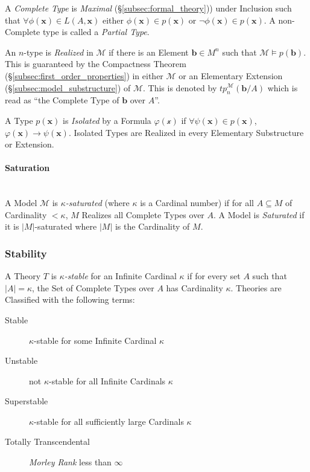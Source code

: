 \documentclass{article}
\begin{document}
A \emph{Complete Type} is \emph{Maximal}
(\S\ref{subsec:formal_theory})) under Inclusion such that $\forall
\phi(\mathbf{x}) \in L(A,\mathbf{x})$ either $\phi(\mathbf{x}) \in
p(\mathbf{x})$ or $\neg \phi(\mathbf{x}) \in p(\mathbf{x})$. A
non-Complete type is called a \emph{Partial Type}.

An $n$-type is \emph{Realized} in $\mathcal{M}$ if there is an Element
$\mathbf{b} \in M^n$ such that $\mathcal{M} \vDash
p(\mathbf{b})$. This is guaranteed by the Compactness Theorem
(\S\ref{subsec:first_order_properties}) in either $\mathcal{M}$ or an
Elementary Extension (\S\ref{subsec:model_substructure}) of
$\mathcal{M}$. This is denoted by $tp_{n}^{\mathcal{M}}(\mathbf{b}/A)$
which is read as ``the Complete Type of $\mathbf{b}$ over $A$''.

A Type $p(\mathbf{x})$ is \emph{Isolated} by a Formula
$\varphi(\mathcal{x})$ if $\forall \psi(\mathbf{x}) \in
p(\mathbf{x})$, $\varphi (\mathbf{x}) \rightarrow
\psi(\mathbf{x})$. Isolated Types are Realized in every Elementary
Substructure or Extension.

\paragraph{Saturation}\label{subsec:model_saturation}\hfill
\\

A Model $\mathcal{M}$ is \emph{$\kappa$-saturated} (where $\kappa$ is
a Cardinal number) if for all $A \subseteq M$ of Cardinality $<
\kappa$, $M$ Realizes all Complete Types over $A$. A Model is
\emph{Saturated} if it is $|M|$-saturated where $|M|$ is the
Cardinality of $M$.

\subsubsection{Stability}\label{subsec:model_stability}

A Theory $T$ is \emph{$\kappa$-stable} for an Infinite Cardinal $\kappa$
if for every set $A$ such that $|A| = \kappa$, the Set of Complete
Types over $A$ has Cardinality $\kappa$. Theories are Classified with
the following terms:
\begin{description}
\item [Stable] $\kappa$-stable for some Infinite Cardinal $\kappa$
\item [Unstable] not $\kappa$-stable for all Infinite Cardinals $\kappa$
\item [Superstable] $\kappa$-stable for all sufficiently large
  Cardinals $\kappa$
\item [Totally Transcendental] \emph{Morley Rank}\cite{morley65} less
  than $\infty$
\end{description}
\end{document}
